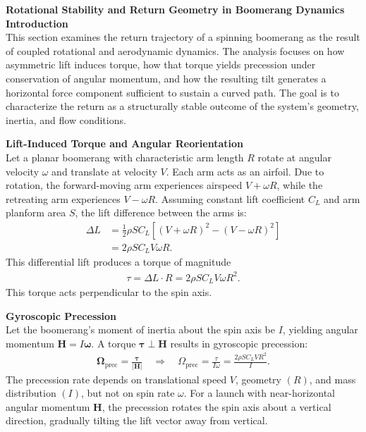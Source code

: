 \begin{technical}
{\Large\textbf{Rotational Stability and Return Geometry in Boomerang Dynamics}}\\[0.7em]

\textbf{Introduction}\\[0.5em]
This section examines the return trajectory of a spinning boomerang as the result of coupled rotational and aerodynamic dynamics. The analysis focuses on how asymmetric lift induces torque, how that torque yields precession under conservation of angular momentum, and how the resulting tilt generates a horizontal force component sufficient to sustain a curved path. The goal is to characterize the return as a structurally stable outcome of the system's geometry, inertia, and flow conditions.

\textbf{Lift-Induced Torque and Angular Reorientation}\\[0.5em]
Let a planar boomerang with characteristic arm length $R$ rotate at angular velocity $\omega$ and translate at velocity $V$. Each arm acts as an airfoil. Due to rotation, the forward-moving arm experiences airspeed $V + \omega R$, while the retreating arm experiences $V - \omega R$. Assuming constant lift coefficient $C_L$ and arm planform area $S$, the lift difference between the arms is:
\begin{align}
\Delta L &= \tfrac{1}{2} \rho S C_L \left[ (V + \omega R)^2 - (V - \omega R)^2 \right]\\ &= 2 \rho S C_L V \omega R.
\end{align}
This differential lift produces a torque of magnitude
\begin{align}
\tau = \Delta L \cdot R = 2 \rho S C_L V \omega R^2.
\end{align}
This torque acts perpendicular to the spin axis.

\textbf{Gyroscopic Precession}\\[0.5em]
Let the boomerang's moment of inertia about the spin axis be $I$, yielding angular momentum $\mathbf{H} = I \boldsymbol{\omega}$. A torque $\boldsymbol{\tau} \perp \mathbf{H}$ results in gyroscopic precession:
\begin{align}
\boldsymbol{\Omega}_\text{prec} = \frac{\boldsymbol{\tau}}{|\mathbf{H}|} \quad \Rightarrow \quad \Omega_\text{prec} = \frac{\tau}{I \omega} = \frac{2 \rho S C_L V R^2}{I}.
\end{align}
The precession rate depends on translational speed $V$, geometry $(R)$, and mass distribution $(I)$, but not on spin rate $\omega$. For a launch with near-horizontal angular momentum $\mathbf{H}$, the precession rotates the spin axis about a vertical direction, gradually tilting the lift vector away from vertical.


\end{technical}
